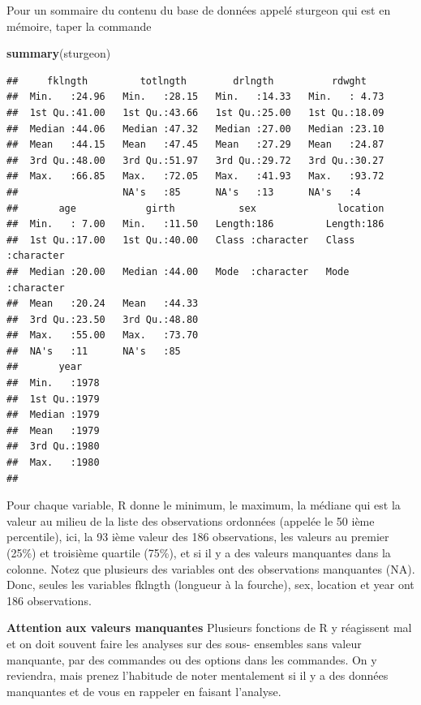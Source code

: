 \documentclass[12pt,]{book}
\makeatletter
\newenvironment{Shaded}{\begin{snugshade}}{\end{snugshade}}
\newcommand{\KeywordTok}[1]{\textcolor[rgb]{0.27,0.27,0.27}{\textbf{#1}}}
\newcommand{\NormalTok}[1]{#1}
\newenvironment{kframe}{%
\medskip{}
\setlength{\fboxsep}{.8em}
 \def\at@end@of@kframe{}%
 \ifinner\ifhmode%
  \def\at@end@of@kframe{\end{minipage}}%
  \begin{minipage}{\columnwidth}%
 \fi\fi%
 \def\FrameCommand##1{\hskip\@totalleftmargin \hskip-\fboxsep
 \colorbox{shadecolor}{##1}\hskip-\fboxsep
     \hskip-\linewidth \hskip-\@totalleftmargin \hskip\columnwidth}%
 \MakeFramed {\advance\hsize-\width
   \@totalleftmargin\z@ \linewidth\hsize
   \@setminipage}}%
 {\par\unskip\endMakeFramed%
 \at@end@of@kframe}
\newenvironment{rmdblock}[1]
  {
  \begin{itemize}
  \renewcommand{\labelitemi}{
    \raisebox{-.7\height}[0pt][0pt]{
      {\setkeys{Gin}{width=3em,keepaspectratio}\texttt{[image: images/\#1]}}
    }
  }
  \setlength{\fboxsep}{1em}
  \begin{kframe}
  \item
  }
  {
  \end{kframe}
  \end{itemize}
  }
\newenvironment{rmdwarning}
  {\begin{rmdblock}{warning}}
  {\end{rmdblock}}
\makeatother
\begin{document}
Pour un sommaire du contenu du base de données appelé sturgeon qui est en mémoire, taper la commande

\begin{Shaded}
\begin{Highlighting}[]
\KeywordTok{summary}\NormalTok{(sturgeon)}
\end{Highlighting}
\end{Shaded}

\begin{verbatim}
##     fklngth         totlngth        drlngth          rdwght     
##  Min.   :24.96   Min.   :28.15   Min.   :14.33   Min.   : 4.73  
##  1st Qu.:41.00   1st Qu.:43.66   1st Qu.:25.00   1st Qu.:18.09  
##  Median :44.06   Median :47.32   Median :27.00   Median :23.10  
##  Mean   :44.15   Mean   :47.45   Mean   :27.29   Mean   :24.87  
##  3rd Qu.:48.00   3rd Qu.:51.97   3rd Qu.:29.72   3rd Qu.:30.27  
##  Max.   :66.85   Max.   :72.05   Max.   :41.93   Max.   :93.72  
##                  NA's   :85      NA's   :13      NA's   :4      
##       age            girth           sex              location        
##  Min.   : 7.00   Min.   :11.50   Length:186         Length:186        
##  1st Qu.:17.00   1st Qu.:40.00   Class :character   Class :character  
##  Median :20.00   Median :44.00   Mode  :character   Mode  :character  
##  Mean   :20.24   Mean   :44.33                                        
##  3rd Qu.:23.50   3rd Qu.:48.80                                        
##  Max.   :55.00   Max.   :73.70                                        
##  NA's   :11      NA's   :85                                           
##       year     
##  Min.   :1978  
##  1st Qu.:1979  
##  Median :1979  
##  Mean   :1979  
##  3rd Qu.:1980  
##  Max.   :1980  
## 
\end{verbatim}

Pour chaque variable, R donne le minimum, le maximum, la médiane qui est la valeur au milieu de la liste des observations ordonnées (appelée le 50 ième percentile), ici, la 93 ième valeur des 186 observations, les valeurs au premier (25\%) et troisième quartile (75\%), et si il y a des valeurs manquantes dans la colonne.
Notez que plusieurs des variables ont des observations manquantes (NA).
Donc, seules les variables fklngth (longueur à la fourche), sex, location et year ont 186 observations.

\begin{rmdwarning}
\textbf{Attention aux valeurs manquantes}
Plusieurs fonctions de R y réagissent mal et on doit souvent faire les analyses sur des sous- ensembles sans valeur manquante, par des commandes ou des options dans les commandes.
On y reviendra, mais prenez l'habitude de noter mentalement si il y a des données manquantes et de vous en rappeler en faisant l'analyse.
\end{rmdwarning}
\end{document}
